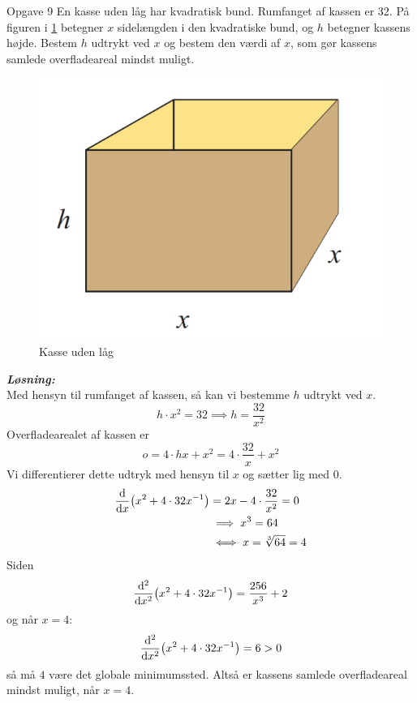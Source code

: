 \documentclass{article}
\newcommand{\sol}{\setlength{\parindent}{0cm}\textbf{\textit{Løsning:}}\setlength{\parindent}{1cm}}
\begin{document}
\begin{question}{Opgave 9}{}
  En kasse uden låg har kvadratisk bund. Rumfanget af kassen er 32. 
På figuren i \cref{fig:kasse} betegner $x$ sidelængden i den kvadratiske bund, og $h$ betegner kassens højde.
Bestem $h$ udtrykt ved $x$ og bestem den værdi af $x$, som gør kassens samlede overfladeareal mindst muligt. 
\end{question}
\begin{figure}[H]
\begin{center}
  \includegraphics[scale=0.7]{Kasse.png}
\end{center}
\caption{Kasse uden låg}
\label{fig:kasse}
\end{figure}
\sol \\ 
Med hensyn til rumfanget af kassen, så kan vi bestemme $h$ udtrykt ved $x$.
\[
h\cdot x^2=32 \implies h=\frac{32}{x^2}
\] 
Overfladearealet af kassen er
\[
o=4\cdot hx + x^2=4\cdot \frac{32}{x} + x^2
\] 
Vi differentierer dette udtryk med hensyn til $x$ og sætter lig med 0.
\begin{equation*}
\begin{split}
  \dv{x} (x^2+4\cdot 32x^{-1})&=2x-4\cdot \frac{32}{x^2} = 0 \\
  &\implies x^3=64 \\ 
  &\iff x=\sqrt[3]{64}=4
\end{split}
\end{equation*}
Siden 
\[
\dv[2]{x} (x^2 + 4\cdot 32x^{-1})=\frac{256}{x^3}+2
\] 
og når $x=4$:
\[
\dv[2]{x} (x^2 + 4\cdot 32x^{-1})=6>0
\] 
så må $4$ være det globale minimumssted.
Altså er kassens samlede overfladeareal mindst muligt, når $x=4$.
\end{document}
